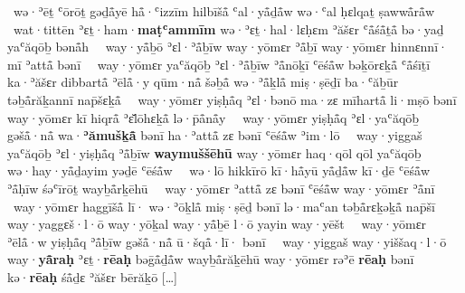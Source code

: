 \begin{Parallel}{0.425\textwidth}{0.545\textwidth}
{	~wə·ʾēṯ ʿōrōṯ gəḏå̄yē hå̄·ʿizzīm hilbīšå̄ ʿal·yå̄ḏå̄w wə·ʿal ḥɛlqaṯ ṣawwå̄rå̄w\ %
	~wat·tittēn ʾɛṯ·ham·\textbf{maṭʿammīm} wə·ʾɛṯ·hal·lɛḥɛm ʾăšɛr ʿå̄śå̄ṯå̄ bə·yaḏ yaʿăqōḇ bənå̄h\ %
	~way·yå̄ḇō ʾɛl·ʾå̄ḇīw way·yōmɛr ʾå̄ḇī way·yōmɛr hinnɛnnī· mī ʾattå̄ bənī\ %
	~way·yōmɛr yaʿăqōḇ ʾɛl·ʾå̄ḇīw ʾå̄nōḵī ʿēśå̄w bəḵōrɛḵå̄ ʿå̄śīṯī ka·ʾăšɛr dibbartå̄ ʾēlå̄·y qūm·nå̄ šəḇå̄ wə·ʾå̄ḵlå̄ miṣ·ṣēḏī ba·ʿăḇūr təḇå̄răḵannī nap̄šɛḵå̄\ %
	~way·yōmɛr yiṣḥå̄q ʾɛl·bənō ma·zɛ mīhartå̄ li·mṣō bənī way·yōmɛr kī hiqrå̄ {\YHWH} ʾɛ̆lōhɛḵå̄ lə·p̄å̄nå̄y\ %
	~way·yōmɛr yiṣḥå̄q ʾɛl·yaʿăqōḇ gəšå̄·nå̄ wa·\textbf{ʾămušḵå̄} bənī ha·ʾattå̄ zɛ bənī ʿēśå̄w ʾim·lō\ %
	~way·yiggaš yaʿăqōḇ ʾɛl·yiṣḥå̄q ʾå̄ḇīw \textbf{waymuššēhū} way·yōmɛr haq·qōl qōl yaʿăqōḇ wə·hay·yå̄ḏayim yəḏē ʿēśå̄w\ %
	~wə·lō hikkīrō kī·hå̄yū yå̄ḏå̄w kī·ḏē ʿēśå̄w ʾå̄ḥīw śəʿīrōṯ wayḇå̄rḵēhū\ %
	~way·yōmɛr ʾattå̄ zɛ bənī ʿēśå̄w way·yōmɛr ʾå̄nī\ %
	~way·yōmɛr haggīšå̄ lī· wə·ʾōḵlå̄ miṣ·ṣēḏ bənī lə·maʿan təḇå̄rɛḵəḵå̄ nap̄šī way·yaggɛš·l·ō way·yōḵal way·yå̄ḇē l·ō yayin way·yēšt\ %
	~way·yōmɛr ʾēlå̄·w yiṣḥå̄q ʾå̄ḇīw gəšå̄·nå̄ ū·šqå̄·lī· bənī\ %
	~way·yiggaš way·yiššaq·l·ō way·\textbf{yå̄raḥ} ʾɛṯ·\textbf{rēaḥ} bəḡå̄ḏå̄w wayḇå̄răḵēhū way·yōmɛr rəʾē \textbf{rēaḥ} bənī kə·\textbf{rēaḥ} śå̄ḏɛ ʾăšɛr bērăḵō {\YHWH}
	[…]
}
\end{Parallel}

